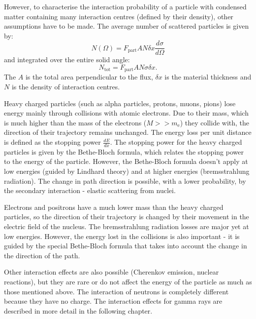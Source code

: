 However, to characterise the interaction probability of a particle with condensed matter containing many interaction centres (defined by their density), other assumptions have to be made. The average number of scattered particles is given by:
 \begin{equation}
 N(\Omega) = F_{\textrm{part}}AN \delta x \frac{d\sigma}{d\Omega}
 \end{equation}
and integrated over the entire solid angle:
 \begin{equation}
 N_{\textrm{tot}} = F_{\textrm{part}}AN\sigma \delta x.
 \end{equation}
The $A$ is the total area perpendicular to the flux, $\delta x$ is the material thickness and $N$ is the density of interaction centres.
\par
Heavy charged particles (such as alpha particles, protons, muons, pions) lose energy mainly through collisions with atomic electrons. Due to their mass, which is much higher than the mass of the electrons ($M >> m_\textrm{e}$) they collide with, the direction of their trajectory remains unchanged. The energy loss per unit distance is defined as the stopping power $\frac{dE}{dx}$. The stopping power for the heavy charged particles is given by the Bethe-Bloch formula, which relates the stopping power to the energy of the particle. However, the Bethe-Bloch formula doesn't apply at low energies (guided by Lindhard theory) and at higher energies (bremsstrahlung radiation). The change in path direction is possible, with a lower probability, by the secondary interaction - elastic scattering from nuclei.
\par
Electrons and positrons have a much lower mass than the heavy charged particles, so the direction of their trajectory is changed by their movement in the electric field of the nucleus. The bremsstrahlung radiation losses are major yet at low energies. However, the energy lost in the collisions is also important - it is guided by the special Bethe-Bloch formula that takes into account the change in the direction of the path. 
\par
Other interaction effects are also possible (Cherenkov emission, nuclear reactions), but they are rare or do not affect the energy of the particle as much as those mentioned above. The interaction of neutrons is completely different because they have no charge. The interaction effects for gamma rays are described in more detail in the following chapter.  
